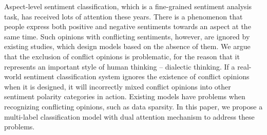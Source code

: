 Aspect-level sentiment classification, which is a fine-grained sentiment analysis task, has received lots of attention these years. There is a phenomenon that people express both positive and negative sentiments towards an aspect at the same time. Such opinions with conflicting sentiments, however, are ignored by existing studies, which design models based on the absence of them. We argue that the exclusion of conflict opinions is problematic, for the reason that it represents an important style of human thinking -- dialectic thinking. If a real-world sentiment classification system ignores the existence of conflict opinions when it is designed, it will incorrectly mixed conflict opinions into other sentiment polarity categories in action.  Existing models have problems when recognizing conflicting opinions, such as data sparsity. In this paper, we propose a multi-label classification model with dual attention mechanism to address these problems.